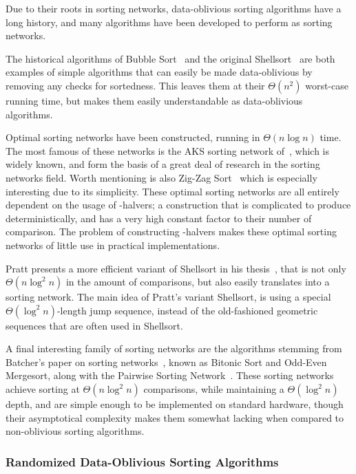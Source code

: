 Due to their roots in sorting networks, data-oblivious sorting algorithms have a long history, and many algorithms have been developed to perform as sorting networks.

The historical algorithms of Bubble Sort~ and the original Shellsort~ are both examples of simple algorithms that can easily be made data-oblivious by removing any checks for sortedness. This leaves them at their $\Theta(n^2)$ worst-case running time, but makes them easily understandable as data-oblivious algorithms.

Optimal sorting networks have been constructed, running in $\Theta(n \log n)$ time. The most famous of these networks is the AKS sorting network of~, which is widely known, and form the basis of a great deal of research in the sorting networks field. Worth mentioning is also Zig-Zag Sort~ which is especially interesting due to its simplicity.
These optimal sorting networks are all entirely dependent on the usage of \textepsilon -halvers; a construction that is complicated to produce deterministically, and  has a very high constant factor to their number of comparison. The problem of constructing \textepsilon -halvers makes these optimal sorting networks of little use in practical implementations.

Pratt presents a more efficient variant of Shellsort in his thesis~, that is not only $\Theta(n \log^2 n)$ in the amount of comparisons, but also easily translates into a sorting network. The main idea of Pratt's variant Shellsort, is using a special $\Theta(\log^2 n)$-length jump sequence, instead of the old-fashioned geometric sequences that are often used in Shellsort.

A final interesting family of sorting networks are the algorithms stemming from Batcher's paper on sorting networks~, known as Bitonic Sort and Odd-Even Mergesort, along with the Pairwise Sorting Network~. These sorting networks achieve sorting at $\Theta(n \log^2 n)$ comparisons, while maintaining a $\Theta(\log^2 n)$ depth, and are simple enough to be implemented on standard hardware, though their asymptotical complexity makes them somewhat lacking when compared to non-oblivious sorting algorithms.

\subsubsection{Randomized Data-Oblivious Sorting Algorithms}

